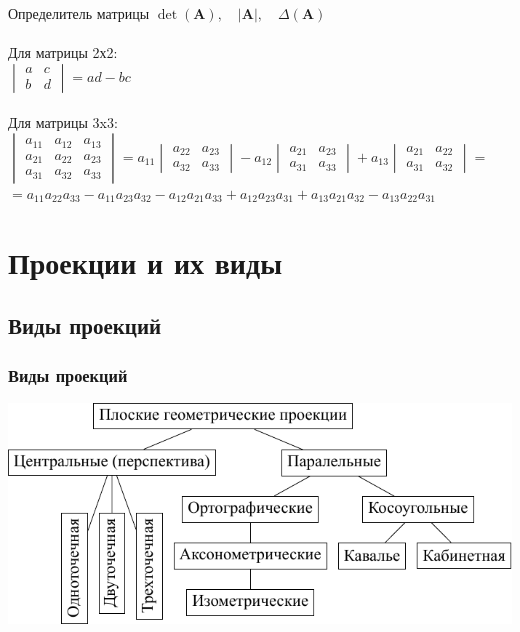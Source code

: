 \documentclass[10pt]{beamer}
\begin{document}
	\begin{frame} {Определитель матрицы}
		$\det(\mathbf A), \quad |\mathbf A|, \quad \Delta(\mathbf A) $ \\ ~ \\
		
		Для матрицы 2х2: \\
		$\begin{vmatrix} a & c \\ b & d \end{vmatrix}=ad-bc$ \\ ~ \\
		Для матрицы 3x3: \\
		$\begin{vmatrix} a_{11} & a_{12} & a_{13} \\ a_{21} & a_{22} & a_{23} \\ a_{31} & a_{32} & a_{33} \end{vmatrix} =
		a_{11}\begin{vmatrix}    a_{22} & a_{23} \\  a_{32} & a_{33} \end{vmatrix}-a_{12}\begin{vmatrix}    a_{21} & a_{23} \\  a_{31} & a_{33} \end{vmatrix}+a_{13}\begin{vmatrix}    a_{21} & a_{22} \\  a_{31} & a_{32} \end{vmatrix} = $\\ 
		$
		= a_{11}a_{22}a_{33} - a_{11}a_{23}a_{32}  - a_{12}a_{21}a_{33}+ a_{12}a_{23}a_{31} + a_{13}a_{21}a_{32} - a_{13}a_{22}a_{31} $
		
		
	\end{frame}
	
	\section{Проекции и их виды}
	
	\frame{\sectionpage}
	\subsection{Виды проекций}
	

	
	
	\begin{frame}
		\frametitle{Виды проекций}
		\includegraphics[width=\textwidth, page=1]{Images/L3/projections.pdf}
	\end{frame}
	
\end{document}
